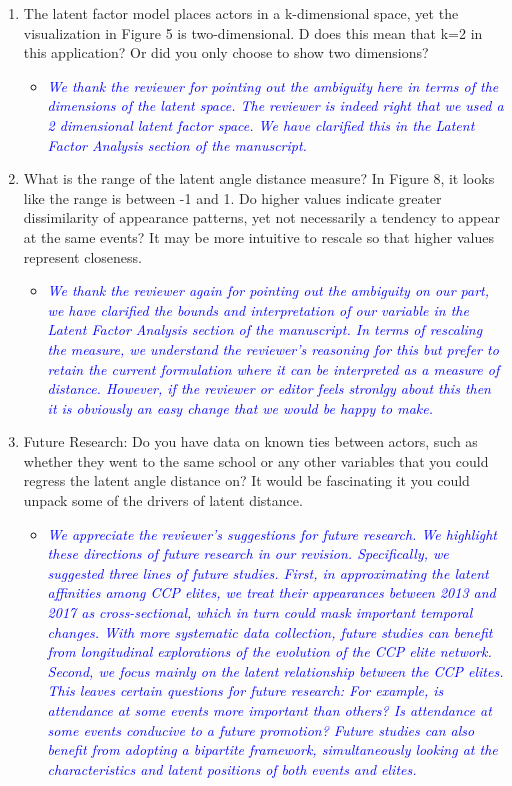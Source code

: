 \begin{enumerate}
	\item The latent factor model places actors in a k-dimensional space, yet the visualization in Figure 5 is two-dimensional. D does this mean that k=2 in this application? Or did you only choose to show two dimensions?
	\begin{itemize}
		\item \textcolor{blue}{ \emph{
			We thank the reviewer for pointing out the ambiguity here in terms of the dimensions of the latent space. The reviewer is indeed right that we used a 2 dimensional latent factor space. We have clarified this in the Latent Factor Analysis section of the manuscript.
		}}
	\end{itemize}
	\item What is the range of the latent angle distance measure? In Figure 8, it looks like the range is between -1 and 1. Do higher values indicate greater dissimilarity of appearance patterns, yet not necessarily a tendency to appear at the same events?  It may be more intuitive to rescale so that higher values represent closeness.
	\begin{itemize}
		\item \textcolor{blue}{ \emph{
			We thank the reviewer again for pointing out the ambiguity on our part, we have clarified the bounds and interpretation of our variable in the Latent Factor Analysis section of the manuscript. In terms of rescaling the measure, we understand the reviewer's reasoning for this but prefer to retain the current formulation where it can be interpreted as a measure of distance. However, if the reviewer or editor feels stronlgy about this then it is obviously an easy change that we would be happy to make.
		}}
	\end{itemize}
	\item Future Research: Do you have data on known ties between actors, such as whether they went to the same school or any other variables that you could regress the latent angle distance on?  It would be fascinating it you could unpack some of the drivers of latent distance.
	\begin{itemize}
		\item \textcolor{blue}{ \emph{
			We appreciate the reviewer's suggestions for future research.  We highlight these directions of future research in our revision.  Specifically, we suggested three lines of future studies.  First, in approximating the latent affinities among CCP elites, we treat their appearances between 2013 and 2017 as cross-sectional, which in turn could mask important temporal changes.  With more systematic data collection, future studies can benefit from longitudinal explorations of the evolution of the CCP elite network.  Second, we focus mainly on the latent relationship between the CCP elites.  This leaves certain questions for future research:  For example, is attendance at some events more important than others?  Is attendance at some events conducive to a future promotion?  Future studies can also benefit from adopting a bipartite framework, simultaneously looking at the characteristics and latent positions of both events and elites.
		}}
	\end{itemize}
\end{enumerate}
